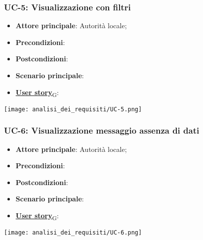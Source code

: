\subsubsection{UC-5: Visualizzazione con filtri}
\begin{itemize}
	\item \textbf{Attore principale}: Autorità locale;
	\item \textbf{Precondizioni}:
	\item \textbf{Postcondizioni}:
	\item \textbf{Scenario principale}:
	\item \href{https://7last.github.io/docs/rtb/documentazione-interna/glossario\#user-story}{\textbf{User story}\textsubscript{G}}:
\end{itemize}

\begin{center}
	\texttt{[image: analisi\_dei\_requisiti/UC-5.png]}
\end{center}


\subsubsection{UC-6: Visualizzazione messaggio assenza di dati}
\begin{itemize}
	\item \textbf{Attore principale}: Autorità locale;
	\item \textbf{Precondizioni}:
	\item \textbf{Postcondizioni}:
	\item \textbf{Scenario principale}:
	\item \href{https://7last.github.io/docs/rtb/documentazione-interna/glossario\#user-story}{\textbf{User story}\textsubscript{G}}:
\end{itemize}

\begin{center}
	\texttt{[image: analisi\_dei\_requisiti/UC-6.png]}
\end{center}

